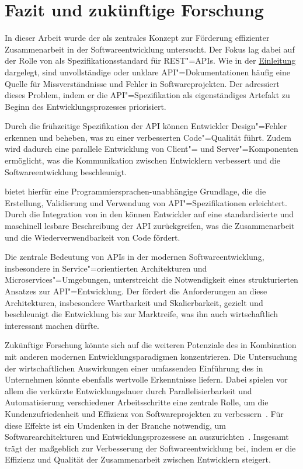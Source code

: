 \chapter{Fazit und zukünftige Forschung}
In dieser Arbeit wurde der \AFA als zentrales Konzept zur Förderung effizienter Zusammenarbeit in der Softwareentwicklung untersucht.
Der Fokus lag dabei auf der Rolle von \OA als Spezifikationsstandard für \ac{REST}"=\acp{API}.
Wie in der \hyperref[ch:introduction]{Einleitung} dargelegt, sind unvollständige oder unklare \ac{API}"=Dokumentationen häufig eine Quelle für Missverständnisse und Fehler in Softwareprojekten.
Der \AFA adressiert dieses Problem, indem er die \ac{API}"=Spezifikation als eigenständiges Artefakt zu Beginn des Entwicklungsprozesses priorisiert.

Durch die frühzeitige Spezifikation der \ac{API} können Entwickler Design"=Fehler erkennen und beheben, was zu einer verbesserten Code"=Qualität führt.
Zudem wird dadurch eine parallele Entwicklung von Client"= und Server"=Komponenten ermöglicht, was die Kommunikation zwischen Entwicklern verbessert und die Softwareentwicklung beschleunigt.

\OA bietet hierfür eine Programmiersprachen-unabhängige Grundlage, die die Erstellung, Validierung und Verwendung von \ac{API}"=Spezifikationen erleichtert.
Durch die Integration von \OA in den \AFA können Entwickler auf eine standardisierte und maschinell lesbare Beschreibung der \ac{API} zurückgreifen, was die Zusammenarbeit und die Wiederverwendbarkeit von Code fördert.

Die zentrale Bedeutung von \acp{API} in der modernen Softwareentwicklung, insbesondere in Service"=orientierten Architekturen und Microservices"=Umgebungen, unterstreicht die Notwendigkeit eines strukturierten Ansatzes zur \ac{API}"=Entwicklung.
Der \AFA fördert die Anforderungen an diese Architekturen, insbesondere Wartbarkeit und Skalierbarkeit, gezielt und beschleunigt die Entwicklung bis zur Marktreife, was ihn auch wirtschaftlich interessant machen dürfte.

Zukünftige Forschung könnte sich auf die weiteren Potenziale des \AFAes in Kombination mit anderen modernen Entwicklungsparadigmen konzentrieren.
Die Untersuchung der wirtschaftlichen Auswirkungen einer umfassenden Einführung des \AFAes in Unternehmen könnte ebenfalls wertvolle Erkenntnisse liefern.
Dabei spielen vor allem die verkürzte Entwicklungsdauer durch Parallelisierbarkeit und Automatisierung verschiedener Arbeitsschritte eine zentrale Rolle, um die Kundenzufriedenheit und Effizienz von Softwareprojekten zu verbessern~\cites[77]{bea22}[355,360]{de23}.
Für diese Effekte ist ein Umdenken in der Branche notwendig, um Softwarearchitekturen und Entwicklungsprozessese an \AF auszurichten~\cites[361]{de23}[2]{kul23}.
Insgesamt trägt der \AFA maßgeblich zur Verbesserung der Softwareentwicklung bei, indem er die Effizienz und Qualität der Zusammenarbeit zwischen Entwicklern steigert.